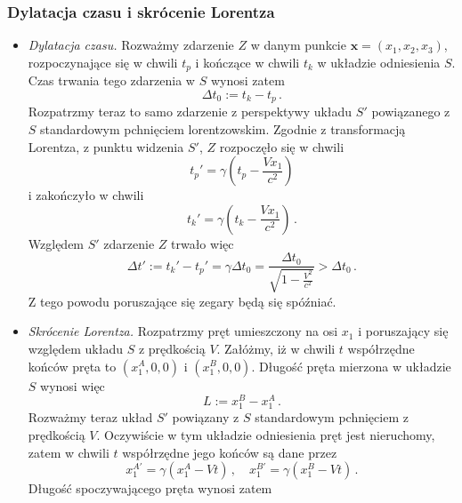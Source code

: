 \documentclass[../main.tex]{subfiles}
\begin{document}
\subsubsection{Dylatacja czasu i skrócenie Lorentza}
\begin{itemize}
    \item \textit{Dylatacja czasu.} Rozważmy zdarzenie \(Z\) w danym punkcie \(\mathbf{x}=(x_1,x_2,x_3)\), rozpoczynające się w chwili \(t_p\) i kończące w chwili \(t_k\) w układzie odniesienia \(S\). Czas trwania tego zdarzenia w \(S\) wynosi zatem
    \begin{equation*}
        \Delta t_0:=t_k-t_p\,.
    \end{equation*}
    Rozpatrzmy teraz to samo zdarzenie z perspektywy układu \(S'\) powiązanego z \(S\) standardowym pchnięciem lorentzowskim. Zgodnie z transformacją Lorentza, z punktu widzenia \(S'\), \(Z\) rozpoczęło się w chwili
    \begin{equation*}
        t_p'=\gamma\left(t_p-\frac{Vx_1}{c^2}\right)
    \end{equation*}
    i zakończyło w chwili
    \begin{equation*}
        t_k'=\gamma\left(t_k-\frac{Vx_1}{c^2}\right)\,.
    \end{equation*}
    Względem \(S'\) zdarzenie \(Z\) trwało więc
    \begin{equation*}
        \Delta t':=t_k'-t_p'=\gamma \Delta t_0=\frac{\Delta t_0}{\sqrt{1-\frac{V^2}{c^2}}}>\Delta t_0\,.
    \end{equation*}
    Z tego powodu poruszające się zegary będą się spóźniać.
    \item \textit{Skrócenie Lorentza.} Rozpatrzmy pręt umieszczony na osi \(x_1\) i poruszający się względem układu \(S\) z prędkością \(V\). Załóżmy, iż w chwili \(t\) współrzędne końców pręta to \((x_1^A,0,0)\) i \((x_1^B,0,0)\). Długość pręta mierzona w układzie \(S\) wynosi więc
    \begin{equation*}
        L:=x_1^B-x_1^A\,.
    \end{equation*}
    Rozważmy teraz układ \(S'\) powiązany z \(S\) standardowym pchnięciem z prędkością \(V\). Oczywiście w tym układzie odniesienia pręt jest nieruchomy, zatem w chwili \(t\) współrzędne jego końców są dane przez
    \begin{equation*}
        x_1^{A'}=\gamma(x_1^A-Vt)\,,\quad x_1^{B'}=\gamma(x_1^B-Vt)\,.
    \end{equation*}
    Długość spoczywającego pręta wynosi zatem
    \begin{equation*}

\end{equation*}
\end{itemize}
\end{document}
